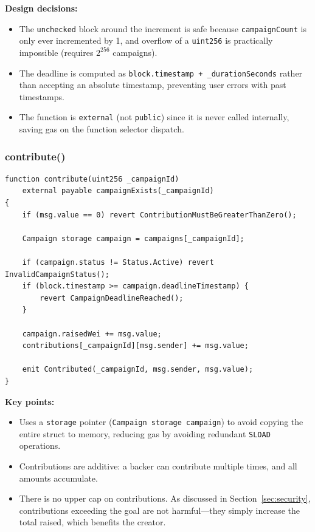 \textbf{Design decisions:}
\begin{itemize}[leftmargin=1.5em]
    \item The \texttt{unchecked} block around the increment is safe because \texttt{campaignCount} is only ever incremented by 1, and overflow of a \texttt{uint256} is practically impossible (requires $2^{256}$ campaigns).
    \item The deadline is computed as \texttt{block.timestamp + \_durationSeconds} rather than accepting an absolute timestamp, preventing user errors with past timestamps.
    \item The function is \texttt{external} (not \texttt{public}) since it is never called internally, saving gas on the function selector dispatch.
\end{itemize}

\subsubsection{contribute()}

\begin{lstlisting}[language=Solidity, caption={Contribution Logic}]
function contribute(uint256 _campaignId)
    external payable campaignExists(_campaignId)
{
    if (msg.value == 0) revert ContributionMustBeGreaterThanZero();

    Campaign storage campaign = campaigns[_campaignId];

    if (campaign.status != Status.Active) revert InvalidCampaignStatus();
    if (block.timestamp >= campaign.deadlineTimestamp) {
        revert CampaignDeadlineReached();
    }

    campaign.raisedWei += msg.value;
    contributions[_campaignId][msg.sender] += msg.value;

    emit Contributed(_campaignId, msg.sender, msg.value);
}
\end{lstlisting}

\textbf{Key points:}
\begin{itemize}[leftmargin=1.5em]
    \item Uses a \texttt{storage} pointer (\texttt{Campaign storage campaign}) to avoid copying the entire struct to memory, reducing gas by avoiding redundant \texttt{SLOAD} operations.
    \item Contributions are additive: a backer can contribute multiple times, and all amounts accumulate.
    \item There is no upper cap on contributions. As discussed in Section~\ref{sec:security}, contributions exceeding the goal are not harmful---they simply increase the total raised, which benefits the creator.
\end{itemize}

